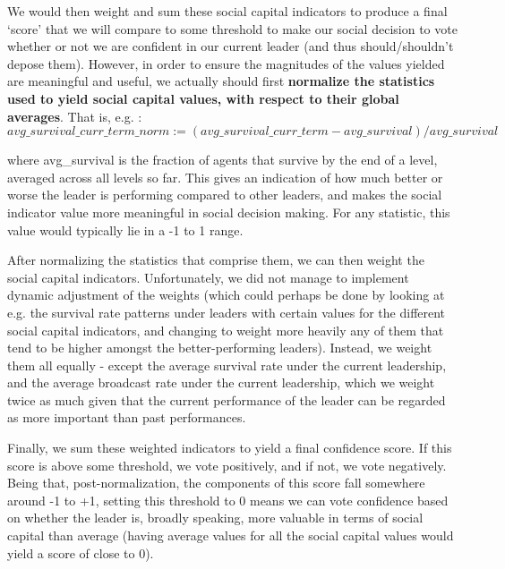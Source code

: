 We would then weight and sum these social capital indicators to produce a final `score' that we will compare to some threshold to make our social decision to vote whether or not we are confident in our current leader (and thus should/shouldn't depose them). However, in order to ensure the magnitudes of the values yielded are meaningful and useful, we actually should first \textbf{normalize the statistics used to yield social capital values, with respect to their global averages}. That is, e.g. : \\

\begin{equation}
    avg\_survival\_curr\_term\_norm := (avg\_survival\_curr\_term-avg\_survival)/avg\_survival
\end{equation}

where avg\_survival is the fraction of agents that survive by the end of a level, averaged across all levels so far. This gives an indication of how much better or worse the leader is performing compared to other leaders, and makes the social indicator value more meaningful in social decision making. For any statistic, this value would typically lie in a -1 to 1 range. 

After normalizing the statistics that comprise them, we can then weight the social capital indicators. Unfortunately, we did not manage to implement dynamic adjustment of the weights (which could perhaps be done by looking at e.g. the survival rate patterns under leaders with certain values for the different social capital indicators, and changing to weight more heavily any of them that tend to be higher amongst the better-performing leaders). Instead, we weight them all equally - except the average survival rate under the current leadership, and the average broadcast rate under the current leadership, which we weight twice as much given that the current performance of the leader can be regarded as more important than past performances. 

Finally, we sum these weighted indicators to yield a final confidence score. If this score is above some threshold, we vote positively, and if not, we vote negatively. Being that, post-normalization, the components of this score fall somewhere around -1 to +1, setting this threshold to 0 means we can vote confidence based on whether the leader is, broadly speaking, more valuable in terms of social capital than average (having average values for all the social capital values would yield a score of close to 0).

